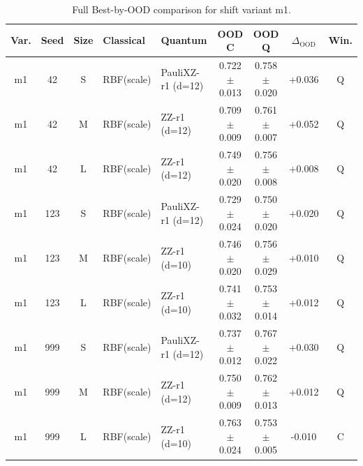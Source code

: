 \documentclass[pdflatex,sn-mathphys-num]{sn-jnl}%
\theoremstyle{thmstyleone}%
\theoremstyle{thmstyletwo}%
\theoremstyle{thmstylethree}%
\begin{document}
\begin{table}[t]
\centering
\caption{Full Best-by-OOD comparison for shift variant m1.}
\label{tab:best_ood_m1}
\scriptsize
\setlength{\tabcolsep}{3pt}
\begin{tabular}{@{}cccp{1.55cm}p{1.75cm}ccc c@{}}
\toprule
Var. & Seed & Size & Classical & Quantum & \shortstack{OOD\\C} & \shortstack{OOD\\Q} & $\Delta_{\mathrm{OOD}}$ & Win. \\
\midrule
m1 & 42  & S & RBF(scale) & PauliXZ-r1 (d=12) & 0.722$\pm$0.013 & 0.758$\pm$0.020 & +0.036 & Q \\
m1 & 42  & M & RBF(scale) & ZZ-r1 (d=12)      & 0.709$\pm$0.009 & 0.761$\pm$0.007 & +0.052 & Q \\
m1 & 42  & L & RBF(scale) & ZZ-r1 (d=12)      & 0.749$\pm$0.020 & 0.756$\pm$0.008 & +0.008 & Q \\
m1 & 123 & S & RBF(scale) & PauliXZ-r1 (d=12) & 0.729$\pm$0.024 & 0.750$\pm$0.020 & +0.020 & Q \\
m1 & 123 & M & RBF(scale) & ZZ-r1 (d=10)      & 0.746$\pm$0.020 & 0.756$\pm$0.029 & +0.010 & Q \\
m1 & 123 & L & RBF(scale) & ZZ-r1 (d=10)      & 0.741$\pm$0.032 & 0.753$\pm$0.014 & +0.012 & Q \\
m1 & 999 & S & RBF(scale) & PauliXZ-r1 (d=12) & 0.737$\pm$0.012 & 0.767$\pm$0.022 & +0.030 & Q \\
m1 & 999 & M & RBF(scale) & ZZ-r1 (d=12)      & 0.750$\pm$0.009 & 0.762$\pm$0.013 & +0.012 & Q \\
m1 & 999 & L & RBF(scale) & ZZ-r1 (d=10)      & 0.763$\pm$0.024 & 0.753$\pm$0.005 & -0.010 & C \\
\bottomrule
\end{tabular}
\end{table}
\end{document}
